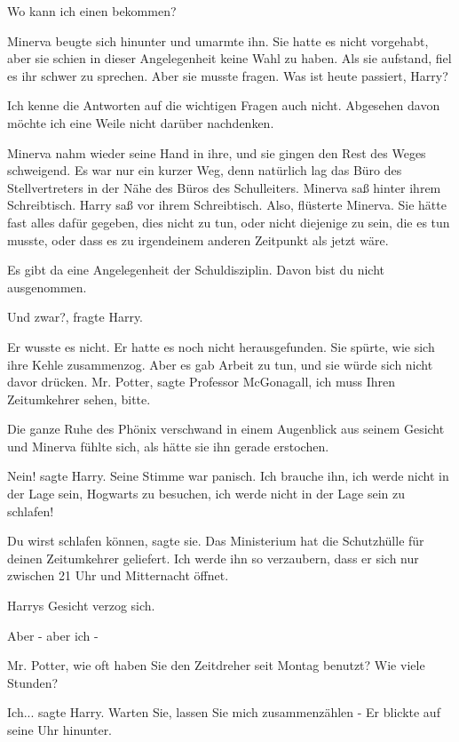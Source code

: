 \glqq{}Wo kann ich einen bekommen?\grqq{}

Minerva beugte sich hinunter und umarmte ihn. Sie hatte es nicht vorgehabt, aber
sie schien in dieser Angelegenheit keine Wahl zu haben. Als sie aufstand, fiel
es ihr schwer zu sprechen. Aber sie musste fragen. \glqq{}Was ist heute passiert,
Harry?\grqq{}

\glqq{}Ich kenne die Antworten auf die wichtigen Fragen auch nicht. Abgesehen
davon möchte ich eine Weile nicht darüber nachdenken.\grqq{}

Minerva nahm wieder seine Hand in ihre, und sie gingen den Rest des Weges
schweigend. Es war nur ein kurzer Weg, denn natürlich lag das Büro des
Stellvertreters in der Nähe des Büros des Schulleiters. Minerva saß hinter ihrem
Schreibtisch. Harry saß vor ihrem Schreibtisch. \glqq{}Also\grqq{}, flüsterte
Minerva. Sie hätte fast alles dafür gegeben, dies nicht zu tun, oder nicht
diejenige zu sein, die es tun musste, oder dass es zu irgendeinem anderen
Zeitpunkt als jetzt wäre.

\glqq{}Es gibt da eine Angelegenheit der Schuldisziplin. Davon bist du nicht
ausgenommen.\grqq{}

\glqq{}Und zwar?\grqq{}, fragte Harry.

Er wusste es nicht. Er hatte es noch nicht herausgefunden. Sie spürte, wie sich
ihre Kehle zusammenzog. Aber es gab Arbeit zu tun, und sie würde sich nicht
davor drücken. \glqq{}Mr. Potter\grqq{}, sagte Professor McGonagall, \glqq{}ich
muss Ihren Zeitumkehrer sehen, bitte.\grqq{}

Die ganze Ruhe des Phönix verschwand in einem Augenblick aus seinem Gesicht und
Minerva fühlte sich, als hätte sie ihn gerade erstochen.

\glqq{}Nein!\grqq{} sagte Harry. Seine Stimme war panisch. \glqq{}Ich brauche ihn,
ich werde nicht in der Lage sein, Hogwarts zu besuchen, ich werde nicht in der
Lage sein zu schlafen!\grqq{}

\glqq{}Du wirst schlafen können\grqq{}, sagte sie. \glqq{}Das Ministerium hat die
Schutzhülle für deinen Zeitumkehrer geliefert. Ich werde ihn so verzaubern, dass
er sich nur zwischen 21 Uhr und Mitternacht öffnet.\grqq{}

Harrys Gesicht verzog sich.

\glqq{}Aber - aber ich -\grqq{}

\glqq{}Mr. Potter, wie oft haben Sie den Zeitdreher seit Montag benutzt? Wie
viele Stunden?\grqq{}

\glqq{}Ich...\grqq{} sagte Harry. \glqq{}Warten Sie, lassen Sie mich
zusammenzählen -\grqq{} Er blickte auf seine Uhr hinunter.

